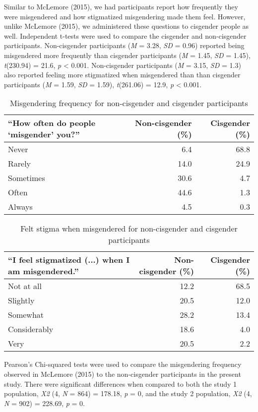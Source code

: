 \documentclass[12pt,twoside]{reedthesis}
\begin{document}
Similar to McLemore (2015), we had participants report how frequently they were misgendered and how stigmatized misgendering made them feel. However, unlike McLemore (2015), we administered these questions to cisgender people as well. Independent t-tests were used to compare the cisgender and non-cisgender participants. Non-cisgender participants (\emph{M} = 3.28, \emph{SD} = 0.96) reported being misgendered more frequently than cisgender participants (\emph{M} = 1.45, \emph{SD} = 1.45), \emph{t}(230.94) = 21.6, \emph{p} \textless{} 0.001.
Non-cisgender participants (\emph{M} = 3.15, \emph{SD} = 1.3) also reported feeling more stigmatized when misgendered than than cisgender participants (\emph{M} = 1.59, \emph{SD} = 1.59), \emph{t}(261.06) = 12.9, \emph{p} \textless{} 0.001.
\begin{table}

\caption{\label{tab:unnamed-chunk-5}Misgendering frequency for non-cisgender and cisgender participants}
\centering
\begin{tabular}[t]{l|r|r}
\hline
“How often do people ‘misgender’ you?” & Non-cisgender (\%) & Cisgender (\%)\\
\hline
Never & 6.4 & 68.8\\
\hline
Rarely & 14.0 & 24.9\\
\hline
Sometimes & 30.6 & 4.7\\
\hline
Often & 44.6 & 1.3\\
\hline
Always & 4.5 & 0.3\\
\hline
\end{tabular}
\end{table}
\begin{table}

\caption{\label{tab:unnamed-chunk-6}Felt stigma when misgendered for non-cisgender and cisgender participants}
\centering
\begin{tabular}[t]{l|r|r}
\hline
“I feel stigmatized (...) when I am misgendered.” & Non-cisgender (\%) & Cisgender (\%)\\
\hline
Not at all & 12.2 & 68.5\\
\hline
Slightly & 20.5 & 12.0\\
\hline
Somewhat & 28.2 & 13.4\\
\hline
Considerably & 18.6 & 4.0\\
\hline
Very & 20.5 & 2.2\\
\hline
\end{tabular}
\end{table}
Pearson's Chi-squared tests were used to compare the misgendering frequency observed in McLemore (2015) to the non-cisgender participants in the present study.
There were significant differences when compared to both the study 1 population, \emph{X2} (4, \emph{N} = 864) = 178.18, \emph{p} = 0, and the study 2 population, \emph{X2} (4, \emph{N} = 902) = 228.69, \emph{p} = 0.
\end{document}

